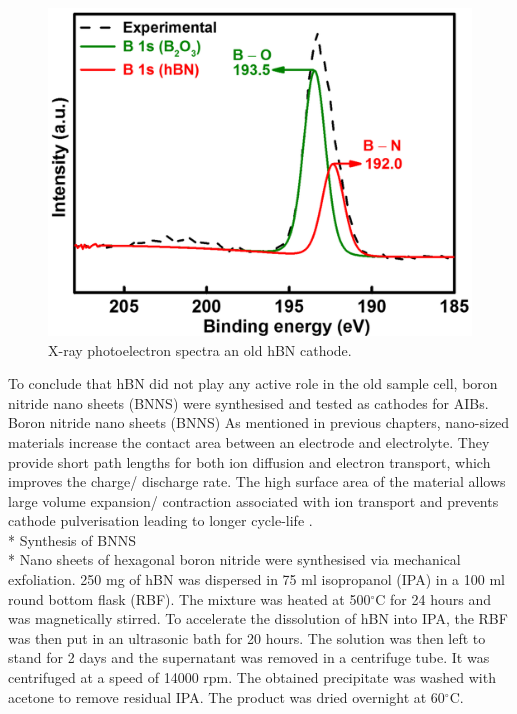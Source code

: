 \begin{figure}[tbh!]
\centering
\includegraphics[width=\textwidth]{Figures/BOhBN/oldxps}
\caption{X-ray photoelectron spectra an old hBN cathode.}
\label{Figures/BOhBN:oldxps}
\end{figure}

To conclude that hBN did not play any active role in the old sample cell, boron nitride nano sheets (BNNS) were synthesised and tested as cathodes for AIBs. 
\large{Boron nitride nano sheets (BNNS)}
As mentioned in previous chapters, nano-sized materials increase the contact area between an electrode and electrolyte. They provide short path lengths for both ion diffusion and electron transport, which improves the charge/ discharge rate. The high surface area of the material allows large volume expansion/ contraction associated with ion transport and prevents cathode pulverisation leading to longer cycle-life \cite{zhang_ultrathin_2015,cong_intrinsic_2015}. \\*
\Large{Synthesis of BNNS} \\*
Nano sheets of hexagonal boron nitride were synthesised via mechanical exfoliation. 250 mg of hBN was dispersed in 75 ml isopropanol (IPA) in a 100 ml round bottom flask (RBF). The mixture was heated at 500$^{\circ}$C for 24 hours and was magnetically stirred. To accelerate the dissolution of hBN into IPA, the RBF was then put in an ultrasonic bath for 20 hours. The solution was then left to stand for 2 days and the supernatant was removed in a centrifuge tube. It was centrifuged at a speed of 14000 rpm. The obtained precipitate was washed with acetone to remove residual IPA. The product was dried overnight at 60$^{\circ}$C. 

